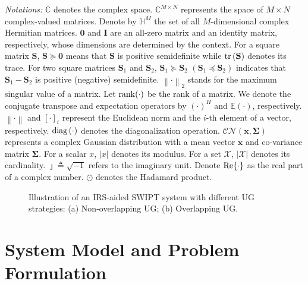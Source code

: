 \documentclass[12pt,draftclsnofoot, onecolumn]{IEEEtran}
\theoremstyle{plain}
\begin{document}
\begin{sloppypar}
\emph{Notations:} $\mathbb C$ denotes the complex space. $\mathbb C^{M\times N}$ represents the space of $M\times N$ complex-valued matrices. Denote by $\mathbb H^M$ the set of all $M$-dimensional complex Hermitian matrices. $\mathbf 0$ and $\mathbf I$ are an all-zero matrix and an identity matrix, respectively, whose dimensions are determined by the context. For a square matrix $\mathbf S$, $\mathbf S\succeq \mathbf 0$ means that $\mathbf S$ is positive semidefinite while ${\rm tr}\left(\mathbf S\right)$ denotes its trace. For two square matrices $\mathbf S_1$ and $\mathbf S_2$, $\mathbf S_1 \succeq \mathbf S_2$ $(\mathbf S_1 \preceq \mathbf S_2)$ indicates that $\mathbf S_1 - \mathbf S_2$ is positive (negative) semidefinite. $\left\|\cdot\right\|_2$ stands for the maximum
singular value of a matrix. Let ${\rm rank}(\cdot)$ be the rank of a matrix. We denote the conjugate transpose and expectation operators by $(\cdot)^H$ and $\mathbb E\left(\cdot\right)$, respectively. $\left\|\cdot\right\|$ and $[\cdot]_i$ represent the Euclidean norm and the $i$-th element of a vector, respectively. ${\rm diag}\left(\cdot\right)$ denotes the diagonalization operation. $\mathcal{CN}\left(\mathbf x,\mathbf \Sigma\right)$ represents a complex Gaussian distribution with a mean vector $\mathbf x$ and co-variance matrix $\mathbf \Sigma$. For a scalar $x$, $\left|x\right|$ denotes its modulus. For a set $\mathcal X$, $\left|\mathcal X\right|$ denotes its cardinality. $\jmath \triangleq \sqrt{-1}$ refers to the imaginary unit. Denote ${\rm Re}\{\cdot\}$ as the real part of a complex number. $\odot$ denotes the Hadamard product. 

\begin{figure}[!t]
	\vspace{-2mm}
	\centering
	\hspace{2mm}
	\caption{Illustration of an IRS-aided SWIPT system with different UG strategies: (a) Non-overlapping UG; (b) Overlapping UG. }
	\label{fig:system_model}
	\vspace{-3mm}
\end{figure}

\section{System Model and Problem Formulation}\label{Sec:model_formu}

\end{sloppypar}
\end{document}
